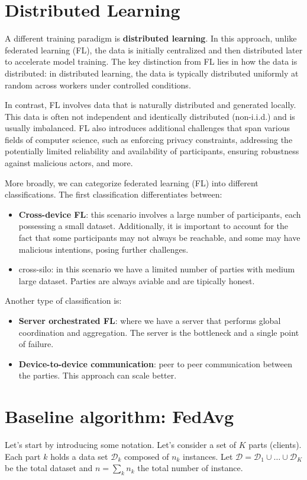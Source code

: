 \section{Distributed Learning}
A different training paradigm is \textbf{distributed learning}. In this approach, unlike federated learning (FL), the
data is initially centralized and then distributed later to accelerate model training. The key distinction from FL 
lies in how the data is distributed: in distributed learning, the data is typically distributed uniformly at random
across workers under controlled conditions.

In contrast, FL involves data that is naturally distributed and generated locally. This data is often not independent 
and identically distributed (non-i.i.d.) and is usually imbalanced. FL also introduces additional challenges that 
span various fields of computer science, such as enforcing privacy constraints, addressing the potentially limited 
reliability and availability of participants, ensuring robustness against malicious actors, and more.

More broadly, we can categorize federated learning (FL) into different classifications. The first classification
differentiates between:
\begin{itemize}
    \item \textbf{Cross-device FL}: this scenario involves a large number of participants, each possessing a small
        dataset. Additionally, it is important to account for the fact that some participants may not always be 
        reachable, and some may have malicious intentions, posing further challenges.
    \item cross-silo: in this scenario we have a limited number of parties with medium large dataset. Parties are always
        aviable and are tipically honest.
\end{itemize}

Another type of classification is:
\begin{itemize}
    \item \textbf{Server orchestrated FL}: where we have a server that performs global coordination and aggregation. The 
        server is the bottleneck and a single point of failure.
    \item \textbf{Device-to-device communication}: peer to peer communication between the parties. This approach can 
        scale better. 
\end{itemize}

\section{Baseline algorithm: FedAvg}
Let's start by introducing some notation. Let’s consider a set of $K$ parts (clients). Each part $k$ holds a data set 
$\mathcal{D}_k$ composed of $n_k$ instances. Let $\mathcal{D} = \mathcal{D}_1 \cup \dots \cup \mathcal{D}_K$ be the total 
dataset and $n = \sum_k n_k$ the total number of instance.

